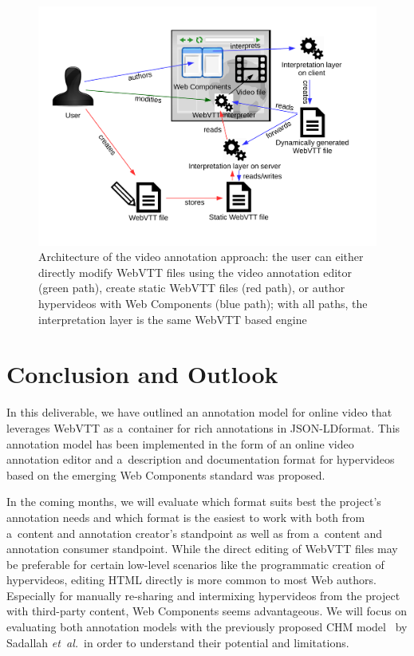 \documentclass[runningheads,a4paper]{llncs}
\def\JSONLD{\mbox{JSON-LD}}
\def\JSONLD{\mbox{JSON-LD}}
\begin{document}
\begin{figure}[hbt]
  \centering
  \includegraphics[width=\linewidth]{architecture}
  \caption{Architecture of the video annotation
    approach: the user can either directly modify
    WebVTT files using the video annotation editor
    (green path), create static WebVTT files (red path), or
    author hypervideos with Web Components
    (blue path); with all paths, the interpretation 
    layer is the same WebVTT based engine}
  \label{fig:architecture}
\end{figure}


  
\section{Conclusion and Outlook}
\label{sec:conclusion-and-outlook}

In this deliverable, we have outlined an annotation model for online video
that leverages WebVTT as a~container for rich annotations in \JSONLD format.
This annotation model has been implemented
in the form of an online video annotation editor
and a~description and documentation format for hypervideos
based on the emerging Web Components standard was proposed.

In the coming months, we will evaluate which format suits best
the project's annotation needs and which format is the easiest to work with
both from a~content and annotation creator's standpoint as well as
from a~content and annotation consumer standpoint.
While the direct editing of WebVTT files may be preferable for certain
low-level scenarios like the programmatic creation of hypervideos,
editing HTML directly is more common to most Web authors.
Especially for manually re-sharing and intermixing hypervideos from the project
with third-party content, Web Components seems advantageous.
We will focus on evaluating both annotation models with the previously
proposed CHM model~\cite{sadallah2012hypervideo} by Sadallah \emph{et~al.}\
in order to understand their potential and limitations. 



\end{document}
